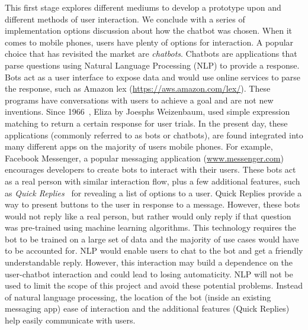 This first stage explores different mediums to develop a prototype upon and different methods of user interaction. We conclude with a series of implementation options discussion about how the chatbot was chosen.\newline
\newline
When it comes to mobile phones, users have plenty of options for interaction. A popular choice that has revisited the market are \textit{chatbots}. Chatbots are applications that parse questions using Natural Language Processing (NLP) to provide a response. Bots act as a user interface to expose data and would use online services to parse the response, such as Amazon lex (\url{https://aws.amazon.com/lex/}). These programs have conversations with users to achieve a goal and are not new inventions. Since 1966~\cite{article_eliza}, Eliza by Joesphs Weizenbaum, used simple expression matching to return a certain response for user trials. In the present day, these applications (commonly referred to as bots or chatbots), are found integrated into many different apps on the majority of users mobile phones. For example, Facebook Messenger, a popular messaging application (\url{www.messenger.com}) encourages developers to create bots to interact with their users. These bots act as a real person with similar interaction flow, plus a few additional features, such as \textit{Quick Replies}~\cite{doc_fb_quick_replies} for revealing a list of options to a user. Quick Replies provide a way to present buttons to the user in response to a message. However, these bots would not reply like a real person, but rather would only reply if that question was pre-trained using machine learning algorithms. This technology requires the bot to be trained on a large set of data and the majority of use cases would have to be accounted for.
NLP would enable users to chat to the bot and get a friendly understandable reply. However, this interaction may build a dependence on the user-chatbot interaction and could lead to losing automaticity. NLP will not be used to limit the scope of this project and avoid these potential problems.
Instead of natural language processing, the location of the bot (inside an existing messaging app) ease of interaction and the additional features (Quick Replies) help easily communicate with users.


